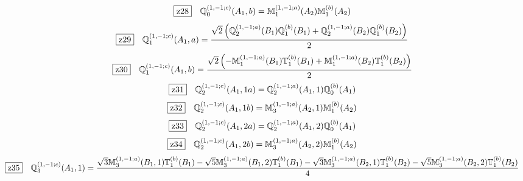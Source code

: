 \documentclass[fleqn,10pt,landscape]{jsarticle}
\begin{document}
\begin{dmath*}
\hspace*{3mm}\fbox{z28}\quad \mathbb{Q}_{0}^{(1,-1;c)}(A_{1},b)=\mathbb{M}_{1}^{(1,-1;a)}(A_{2}) \mathbb{M}_{1}^{(b)}(A_{2})
\end{dmath*}
\begin{dmath*}
\hspace*{3mm}\fbox{z29}\quad \mathbb{Q}_{1}^{(1,-1;c)}(A_{1},a)=\frac{\sqrt{2} \left(\mathbb{Q}_{2}^{(1,-1;a)}(B_{1}) \mathbb{Q}_{1}^{(b)}(B_{1}) + \mathbb{Q}_{2}^{(1,-1;a)}(B_{2}) \mathbb{Q}_{1}^{(b)}(B_{2})\right)}{2}
\end{dmath*}
\begin{dmath*}
\hspace*{3mm}\fbox{z30}\quad \mathbb{Q}_{1}^{(1,-1;c)}(A_{1},b)=\frac{\sqrt{2} \left(- \mathbb{M}_{1}^{(1,-1;a)}(B_{1}) \mathbb{T}_{1}^{(b)}(B_{1}) + \mathbb{M}_{1}^{(1,-1;a)}(B_{2}) \mathbb{T}_{1}^{(b)}(B_{2})\right)}{2}
\end{dmath*}
\begin{dmath*}
\hspace*{3mm}\fbox{z31}\quad \mathbb{Q}_{2}^{(1,-1;c)}(A_{1},1a)=\mathbb{Q}_{2}^{(1,-1;a)}(A_{1},1) \mathbb{Q}_{0}^{(b)}(A_{1})
\end{dmath*}
\begin{dmath*}
\hspace*{3mm}\fbox{z32}\quad \mathbb{Q}_{2}^{(1,-1;c)}(A_{1},1b)=\mathbb{M}_{3}^{(1,-1;a)}(A_{2},1) \mathbb{M}_{1}^{(b)}(A_{2})
\end{dmath*}
\begin{dmath*}
\hspace*{3mm}\fbox{z33}\quad \mathbb{Q}_{2}^{(1,-1;c)}(A_{1},2a)=\mathbb{Q}_{2}^{(1,-1;a)}(A_{1},2) \mathbb{Q}_{0}^{(b)}(A_{1})
\end{dmath*}
\begin{dmath*}
\hspace*{3mm}\fbox{z34}\quad \mathbb{Q}_{2}^{(1,-1;c)}(A_{1},2b)=\mathbb{M}_{3}^{(1,-1;a)}(A_{2},2) \mathbb{M}_{1}^{(b)}(A_{2})
\end{dmath*}
\begin{dmath*}
\hspace*{3mm}\fbox{z35}\quad \mathbb{Q}_{3}^{(1,-1;c)}(A_{1},1)=\frac{\sqrt{3} \mathbb{M}_{3}^{(1,-1;a)}(B_{1},1) \mathbb{T}_{1}^{(b)}(B_{1}) - \sqrt{5} \mathbb{M}_{3}^{(1,-1;a)}(B_{1},2) \mathbb{T}_{1}^{(b)}(B_{1}) - \sqrt{3} \mathbb{M}_{3}^{(1,-1;a)}(B_{2},1) \mathbb{T}_{1}^{(b)}(B_{2}) - \sqrt{5} \mathbb{M}_{3}^{(1,-1;a)}(B_{2},2) \mathbb{T}_{1}^{(b)}(B_{2})}{4}
\end{dmath*}
\end{document}
